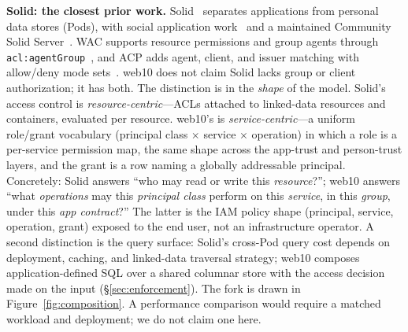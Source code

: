 \documentclass[sigconf, nonacm]{acmart}
\begin{document}
\textbf{Solid: the closest prior work.}
Solid~\cite{solid2016} separates applications from personal data stores
(Pods), with social application work~\cite{solid-apps2016} and a maintained
Community Solid Server~\cite{css2024}. WAC supports resource permissions and
group agents through \texttt{acl:agentGroup}~\cite{wac2022}, and ACP adds
agent, client, and issuer matching with allow/deny mode
sets~\cite{acp2022}. web10 does not claim Solid lacks group or client
authorization; it has both. The distinction is in the \emph{shape} of the
model. Solid's access control is \emph{resource-centric}---ACLs attached to
linked-data resources and containers, evaluated per resource. web10's is
\emph{service-centric}---a uniform role/grant vocabulary
(principal class $\times$ service $\times$ operation) in which a role is a
per-service permission map, the same shape across the app-trust and
person-trust layers, and the grant is a row naming a globally addressable
principal. Concretely: Solid answers ``who may read or write this
\emph{resource}?''; web10 answers ``what \emph{operations} may this
\emph{principal class} perform on this \emph{service}, in this
\emph{group}, under this \emph{app contract}?'' The latter is the IAM policy
shape (principal, service, operation, grant) exposed to the end user, not an
infrastructure operator. A second distinction is the query surface: Solid's
cross-Pod query cost depends on deployment, caching, and linked-data
traversal strategy; web10 composes application-defined SQL over a shared
columnar store with the access decision made on the input
(\S\ref{sec:enforcement}). The fork is drawn in
Figure~\ref{fig:composition}. A performance comparison would require a
matched workload and deployment; we do not claim one here.
\end{document}
